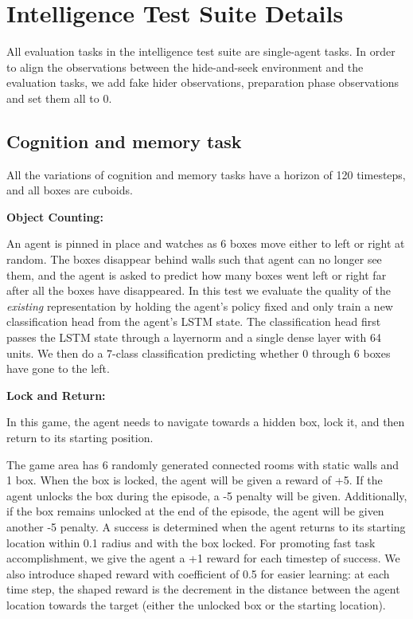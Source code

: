 \section{Intelligence Test Suite Details}
\label{appendix:transfer_details}
All evaluation tasks in the intelligence test suite are single-agent tasks.
In order to align the observations between the hide-and-seek environment and the evaluation tasks, we add fake hider observations, preparation phase observations and set them all to 0.

\subsection{Cognition and memory task}
All the variations of cognition and memory tasks have a horizon of 120 timesteps, and all boxes are cuboids.

\textbf{Object Counting: } 

An agent is pinned in place and watches as 6 boxes move either to left or right at random. The boxes disappear behind walls such that agent can no longer see them, and the agent is asked to predict how many boxes went left or right far after all the boxes have disappeared. In this test we evaluate the quality of the \textit{existing} representation by holding the agent's policy fixed and only train a new classification head from the agent's LSTM state. The classification head first passes the LSTM state through a layernorm and a single dense layer with 64 units. We then do a 7-class classification predicting whether 0 through 6 boxes have gone to the left.

\textbf{Lock and Return: } 

In this game, the agent needs to navigate towards a hidden box, lock it, and then return to its starting position. 

The game area has 6  randomly generated connected rooms with static walls and 1 box. When the box is locked, the agent will be given a reward of +5. If the agent unlocks the box during the episode, a -5 penalty will be given. Additionally, if the box remains unlocked at the end of the episode, the agent will be given another -5 penalty. A success is determined when the agent returns to its starting location within 0.1 radius and with the box locked. For promoting fast task accomplishment, we give the agent a +1 reward for each timestep of success. We also introduce shaped reward with coefficient of 0.5 for easier learning: at each time step, the shaped reward is the decrement in the distance between the agent location towards the target (either the unlocked box or the starting location). 

